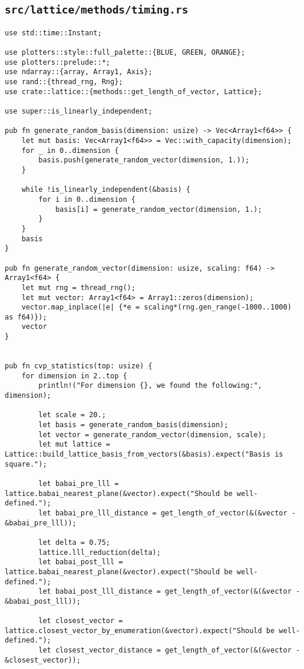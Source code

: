 \subsection{\texttt{src/lattice/methods/timing.rs}}

\begin{verbatim}
use std::time::Instant;

use plotters::style::full_palette::{BLUE, GREEN, ORANGE};
use plotters::prelude::*;
use ndarray::{array, Array1, Axis};
use rand::{thread_rng, Rng};
use crate::lattice::{methods::get_length_of_vector, Lattice};

use super::is_linearly_independent;

pub fn generate_random_basis(dimension: usize) -> Vec<Array1<f64>> {
    let mut basis: Vec<Array1<f64>> = Vec::with_capacity(dimension);
    for _ in 0..dimension {
        basis.push(generate_random_vector(dimension, 1.));
    }

    while !is_linearly_independent(&basis) {
        for i in 0..dimension {
            basis[i] = generate_random_vector(dimension, 1.);
        }
    }
    basis
}

pub fn generate_random_vector(dimension: usize, scaling: f64) -> Array1<f64> {
    let mut rng = thread_rng();
    let mut vector: Array1<f64> = Array1::zeros(dimension);
    vector.map_inplace(|e| {*e = scaling*(rng.gen_range(-1000..1000) as f64)});
    vector
}


pub fn cvp_statistics(top: usize) {
    for dimension in 2..top {
        println!("For dimension {}, we found the following:", dimension);
        
        let scale = 20.;
        let basis = generate_random_basis(dimension);
        let vector = generate_random_vector(dimension, scale);
        let mut lattice = Lattice::build_lattice_basis_from_vectors(&basis).expect("Basis is square.");
        
        let babai_pre_lll = lattice.babai_nearest_plane(&vector).expect("Should be well-defined.");
        let babai_pre_lll_distance = get_length_of_vector(&(&vector - &babai_pre_lll));

        let delta = 0.75;
        lattice.lll_reduction(delta);
        let babai_post_lll = lattice.babai_nearest_plane(&vector).expect("Should be well-defined.");
        let babai_post_lll_distance = get_length_of_vector(&(&vector - &babai_post_lll));

        let closest_vector = lattice.closest_vector_by_enumeration(&vector).expect("Should be well-defined.");
        let closest_vector_distance = get_length_of_vector(&(&vector - &closest_vector));


\end{verbatim}
